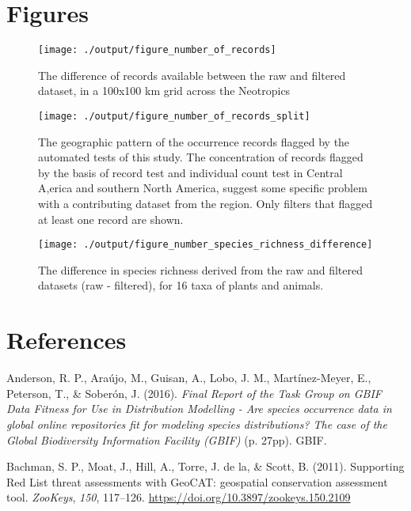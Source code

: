 \documentclass[
  12pt,
]{article}
\begin{document}
\newpage{}

\hypertarget{figures}{%
\section{Figures}\label{figures}}

\begin{figure}
\texttt{[image: ./output/figure\_number\_of\_records]} \caption{The difference of records available between the raw and filtered dataset, in a 100x100 km grid across the Neotropics}\label{fig:total}
\end{figure}

\begin{figure}
\texttt{[image: ./output/figure\_number\_of\_records\_split]} \caption{The geographic pattern of the occurrence records flagged by the automated tests of this study. The concentration of records flagged by the basis of record test and individual count test in Central A,erica and southern North America, suggest some specific problem with a contributing dataset from the region. Only filters that flagged at least one record are shown.}\label{fig:split}
\end{figure}

\begin{figure}
\texttt{[image: ./output/figure\_number\_species\_richness\_difference]} \caption{The difference in species richness derived from the raw and filtered datasets (raw - filtered), for 16 taxa of plants and animals.}\label{fig:speciesrichness}
\end{figure}

\newpage{}

\hypertarget{references}{%
\section*{References}\label{references}}

\hypertarget{refs}{}
\leavevmode\hypertarget{ref-Anderson2016}{}%
Anderson, R. P., Araújo, M., Guisan, A., Lobo, J. M., Martínez-Meyer, E., Peterson, T., \& Soberón, J. (2016). \emph{Final Report of the Task Group on GBIF Data Fitness for Use in Distribution Modelling - Are species occurrence data in global online repositories fit for modeling species distributions? The case of the Global Biodiversity Information Facility (GBIF)} (p. 27pp). GBIF.

\leavevmode\hypertarget{ref-Bachman2011}{}%
Bachman, S. P., Moat, J., Hill, A., Torre, J. de la, \& Scott, B. (2011). Supporting Red List threat assessments with GeoCAT: geospatial conservation assessment tool. \emph{ZooKeys}, \emph{150}, 117--126. \url{https://doi.org/10.3897/zookeys.150.2109}
\end{document}
